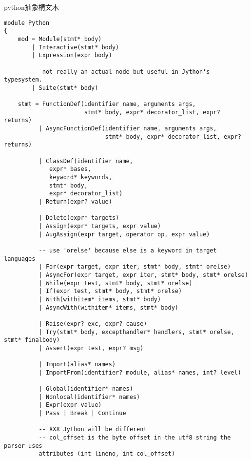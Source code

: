 \begin{itembox}[l]{python抽象構文木}
\begin{verbatim}
module Python
{
    mod = Module(stmt* body)
        | Interactive(stmt* body)
        | Expression(expr body)

        -- not really an actual node but useful in Jython's typesystem.
        | Suite(stmt* body)

    stmt = FunctionDef(identifier name, arguments args,
                       stmt* body, expr* decorator_list, expr? returns)
          | AsyncFunctionDef(identifier name, arguments args,
                             stmt* body, expr* decorator_list, expr? returns)

          | ClassDef(identifier name,
             expr* bases,
             keyword* keywords,
             stmt* body,
             expr* decorator_list)
          | Return(expr? value)

          | Delete(expr* targets)
          | Assign(expr* targets, expr value)
          | AugAssign(expr target, operator op, expr value)

          -- use 'orelse' because else is a keyword in target languages
          | For(expr target, expr iter, stmt* body, stmt* orelse)
          | AsyncFor(expr target, expr iter, stmt* body, stmt* orelse)
          | While(expr test, stmt* body, stmt* orelse)
          | If(expr test, stmt* body, stmt* orelse)
          | With(withitem* items, stmt* body)
          | AsyncWith(withitem* items, stmt* body)

          | Raise(expr? exc, expr? cause)
          | Try(stmt* body, excepthandler* handlers, stmt* orelse, stmt* finalbody)
          | Assert(expr test, expr? msg)

          | Import(alias* names)
          | ImportFrom(identifier? module, alias* names, int? level)

          | Global(identifier* names)
          | Nonlocal(identifier* names)
          | Expr(expr value)
          | Pass | Break | Continue

          -- XXX Jython will be different
          -- col_offset is the byte offset in the utf8 string the parser uses
          attributes (int lineno, int col_offset)


\end{verbatim}
\end{itembox}
